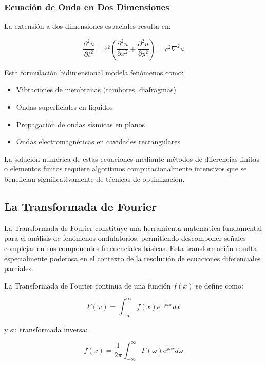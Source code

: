 \documentclass[a4paper]{article}
\begin{document}
\subsubsection{Ecuación de Onda en Dos Dimensiones}

La extensión a dos dimensiones espaciales resulta en:

\begin{equation}
    \frac{\partial^2 u}{\partial t^2} = c^2 \left(\frac{\partial^2 u}{\partial x^2} + \frac{\partial^2 u}{\partial y^2}\right) = c^2 \nabla^2 u
\end{equation}

Esta formulación bidimensional modela fenómenos como:

\begin{itemize}
    \item Vibraciones de membranas (tambores, diafragmas)
    \item Ondas superficiales en líquidos
    \item Propagación de ondas sísmicas en planos
    \item Ondas electromagnéticas en cavidades rectangulares
\end{itemize}

La solución numérica de estas ecuaciones mediante métodos de diferencias finitas o elementos finitos requiere algoritmos computacionalmente intensivos que se benefician significativamente de técnicas de optimización.

\subsection{La Transformada de Fourier}

La Transformada de Fourier constituye una herramienta matemática fundamental para el análisis de fenómenos ondulatorios, permitiendo
descomponer señales complejas en sus componentes frecuenciales básicas. Esta transformación resulta especialmente poderosa en el
contexto de la resolución de ecuaciones diferenciales parciales.

La Transformada de Fourier continua de una función $f(x)$ se define como:

\begin{equation}
    F(\omega) = \int_{-\infty}^{\infty} f(x) e^{-j\omega x} dx
\end{equation}

y su transformada inversa:

\begin{equation}
    f(x) = \frac{1}{2\pi} \int_{-\infty}^{\infty} F(\omega) e^{j\omega x} d\omega
\end{equation}
\end{document}
